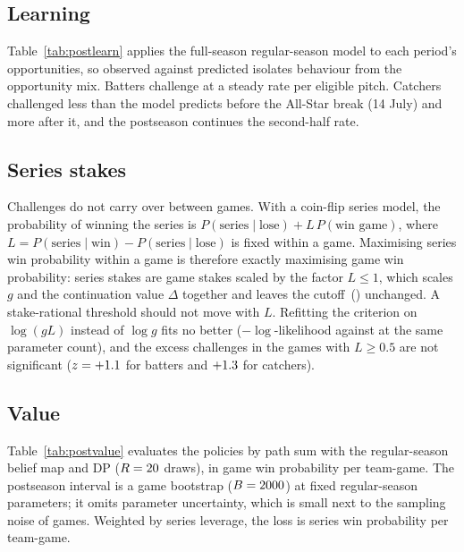 \documentclass[aoas]{imsart}
\theoremstyle{plain}
\theoremstyle{definition}
\begin{document}
\subsection{Learning}
Table~\ref{tab:postlearn} applies the full-season regular-season model to each period's opportunities, so observed
against predicted isolates behaviour from the opportunity mix. Batters challenge at a steady rate per eligible pitch.
Catchers challenged less than the model predicts before the All-Star break (14 July) and more after it, and the postseason
continues the second-half rate.

\begin{table}[!htbp]
\caption{Challenges per 100 eligible pitches and observed against predicted challenges, full-season model.}\label{tab:postlearn}
\centering\small
\resizebox{\textwidth}{!}{}
\end{table}

\subsection{Series stakes}
Challenges do not carry over between games. With a coin-flip series model, the probability of winning the series is
$P(\text{series}\mid\text{lose})+L\,P(\text{win game})$, where $L=P(\text{series}\mid\text{win})-P(\text{series}\mid
\text{lose})$ is fixed within a game. Maximising series win probability within a game is therefore exactly
maximising game win probability: series stakes are game stakes scaled by the factor $L\le1$, which
scales $g$ and the continuation value $\Delta$ together and leaves the cutoff~() unchanged. A
stake-rational threshold should not move with $L$. Refitting the criterion on $\log(gL)$ instead of $\log g$ fits no
better ($-\log$-likelihood \PostNLLSeries{} against \PostNLLGame{} at the same parameter count), and the excess
challenges in the \PostHighLGames{} games with $L\ge0.5$ are not significant ($z=+1.1$ for batters and
$+1.3$ for catchers).

\subsection{Value}
Table~\ref{tab:postvalue} evaluates the policies by path sum with the regular-season belief map and DP ($R=20$
draws), in game win probability per team-game. The postseason interval is a game bootstrap ($B=2000$) at fixed
regular-season parameters; it omits parameter uncertainty, which is small next to the sampling noise of \PostGames{}
games. Weighted by series leverage, the loss is \PostSeriesLostWP{} \PostSeriesLostWPCI{} series win probability per
team-game.
\end{document}

